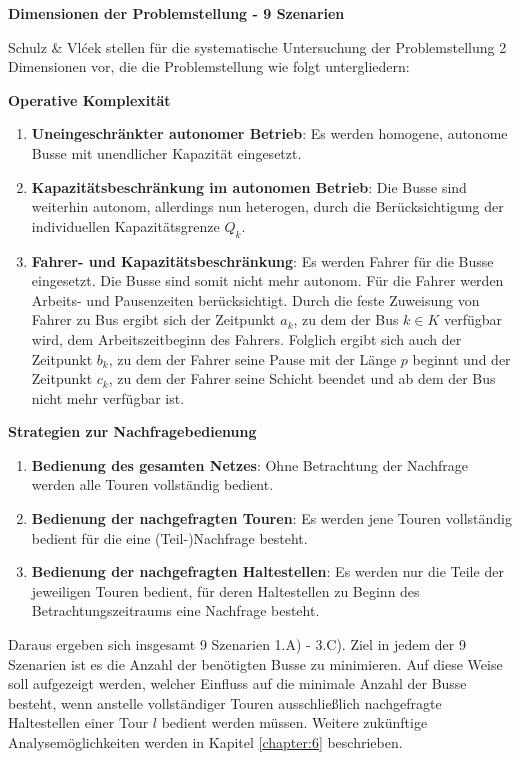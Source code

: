 \textbf{Dimensionen der Problemstellung - 9 Szenarien}

Schulz \& Vlćek stellen für die systematische Untersuchung der Problemstellung 2 Dimensionen vor, die die Problemstellung wie folgt untergliedern:

\textbf{Operative Komplexität}
\begin{enumerate}
    \item \textbf{Uneingeschränkter autonomer Betrieb}: Es werden homogene, autonome Busse mit unendlicher Kapazität eingesetzt.
    \item \textbf{Kapazitätsbeschränkung im autonomen Betrieb}: Die Busse sind weiterhin autonom, allerdings nun heterogen, durch die Berücksichtigung der individuellen Kapazitätsgrenze $Q_k$.
    \item \textbf{Fahrer- und Kapazitätsbeschränkung}: Es werden Fahrer für die Busse eingesetzt. Die Busse sind somit nicht mehr autonom. Für die Fahrer werden Arbeits- und Pausenzeiten berücksichtigt. Durch die feste Zuweisung von Fahrer zu Bus ergibt sich der Zeitpunkt $a_k$, zu dem der Bus $k \in K$ verfügbar wird, dem Arbeitszeitbeginn des Fahrers. Folglich ergibt sich auch der Zeitpunkt $b_k$, zu dem der Fahrer seine Pause mit der Länge $p$ beginnt und der Zeitpunkt $c_k$, zu dem der Fahrer seine Schicht beendet und ab dem der Bus nicht mehr verfügbar ist. 
\end{enumerate}
\textbf{Strategien zur Nachfragebedienung}
\begin{enumerate}[label=\Alph*)]
    \item \textbf{Bedienung des gesamten Netzes}: Ohne Betrachtung der Nachfrage werden alle Touren vollständig bedient.
    \item \textbf{Bedienung der nachgefragten Touren}: Es werden jene Touren vollständig bedient für die eine (Teil-)Nachfrage besteht.
    \item \textbf{Bedienung der nachgefragten Haltestellen}: Es werden nur die Teile der jeweiligen Touren bedient, für deren Haltestellen zu Beginn des Betrachtungszeitraums eine Nachfrage besteht.
\end{enumerate}

Daraus ergeben sich insgesamt 9 Szenarien 1.A) - 3.C). Ziel in jedem der 9 Szenarien ist es die Anzahl der benötigten Busse zu minimieren. Auf diese Weise soll aufgezeigt werden, welcher Einfluss auf die minimale Anzahl der Busse besteht, wenn anstelle vollständiger Touren ausschließlich nachgefragte Haltestellen einer Tour $l$ bedient werden müssen.
Weitere zukünftige Analysemöglichkeiten werden in Kapitel \ref{chapter:6} beschrieben.

